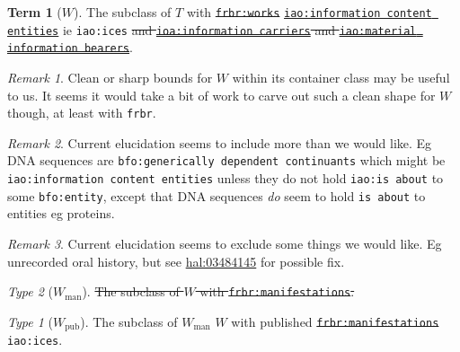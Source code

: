 \documentclass{amsart}%
\newcommand{\code}[1]{\texttt{#1}}%
\theoremstyle{plain}
\theoremstyle{definition}
\theoremstyle{remark}
\theoremstyle{definition}
\newtheorem{term}{Term}[subsection]%
\theoremstyle{remark}
\newtheorem*{term-type}{Type}
\newtheorem*{term-note}{Remark}
\begin{document}
\begin{term}[\(W\)]
\label{term:w}
The subclass of \(T\) with \sout{\code{frbr:works}} \href{http://purl.obolibrary.org/obo/IAO_0000030}{\code{iao:information content entities}} ie \code{iao:ices} \sout{and \href{http://purl.obolibrary.org/obo/IAO_0000015}{\code{ioa:information carriers}} and \href{http://purl.obolibrary.org/obo/IAO_0000178}{\code{iao:material information bearers}}}.%
\begin{term-note}
Clean or sharp bounds for \(W\) within its container class may be useful to us. It seems it would take a bit of work to carve out such a clean shape for \(W\) though, at least with \code{frbr}.%
\end{term-note}
\begin{term-note}
Current elucidation seems to include more than we would like. Eg DNA sequences are \code{bfo:generically dependent continuants} which might be \code{iao:information content entities} unless they do not hold \code{iao:is about} to some \code{bfo:entity}, except that DNA sequences \emph{do} seem to hold \code{is about} to entities eg proteins.
\end{term-note}
\begin{term-note}
Current elucidation seems to exclude some things we would like. Eg unrecorded oral history, but see \href{https://hal.science/hal-03484145}{hal:03484145} for possible fix.
\end{term-note}
\begin{term-type}[\sout{\(W_{\text{man}}\)}]
\sout{The subclass of \(W\) with \code{frbr:manifestations}.}
\begin{term-type}[\(W_{\text{pub}}\)]
The subclass of \sout{\(W_{\text{man}}\)} \(W\) with published \sout{\code{frbr:manifestations}} \code{iao:ices}.
\end{term-type}%
\end{term-type}%
\end{term}
%
%
%
\end{document}
